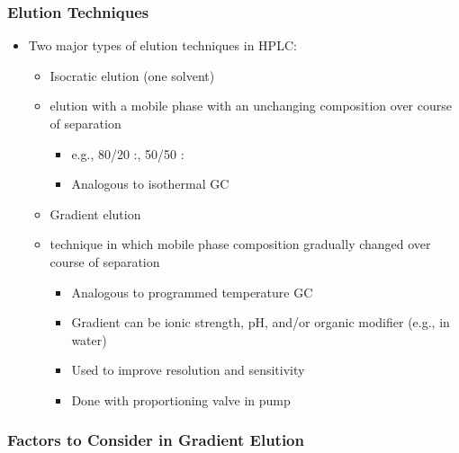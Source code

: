 \documentclass[a4paper, 12pt]{article}
\begin{document}
\subsubsection{Elution Techniques}

\begin{itemize}
	\item Two major types of elution techniques in HPLC:
	\begin{itemize}
		\item Isocratic elution (one solvent)
		\item elution with a mobile phase with an unchanging composition over course of separation
		\begin{itemize}
			\item e.g., 80/20 :, 50/50 :
			\item Analogous to isothermal GC
		\end{itemize}
		\item Gradient elution
		\item technique in which mobile phase composition gradually changed over course of separation
		\begin{itemize}
			\item Analogous to programmed temperature GC
			\item Gradient can be ionic strength, pH, and/or organic modifier (e.g.,  in water)
			\item Used to improve resolution and sensitivity
			\item Done with proportioning valve in pump
		\end{itemize}
	\end{itemize}
\end{itemize}

\subsubsection{Factors to Consider in Gradient Elution}
\end{document}
